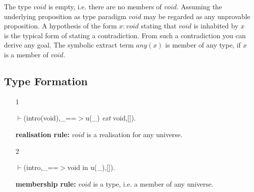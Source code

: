 \documentclass[11pt]{report}
\begin{document}
 The type $void$ is empty, i.e. there are no members of $void$. 
 Assuming the underlying proposition as type paradigm $void$
 may be regarded as any unprovable proposition. A hypothesis
 of the form $x:void$ stating that $void$ is inhabited by $x$
 is the typical form of stating a contradiction.
 From such a contradiction you can derive any goal. The
 symbolic extract term $any(x)$ is member of any type, if
 $x$ is a member of $void$.
 
 \subsection{Type Formation}
  
 \begin{enumerate}
 \item[1]
\begin{sf}\begin{tabbing}
$\vdash$(intro(void),\_\hspace{0.1em}==$>$u(\_\hspace{0.1em}) \mbox{\it ext} void,[]).
\end{tabbing}\end{sf}

 {\bf realisation rule:} 
 $void$ is a realisation for any universe.
  
 \item[2]
\begin{sf}\begin{tabbing}
$\vdash$(intro,\_\hspace{0.1em}==$>$void in u(\_\hspace{0.1em}),[]).
\end{tabbing}\end{sf}

 {\bf membership rule:} $void$ is a type, i.e. a member 
 of any universe.
 \end{enumerate}
  
\end{document}
